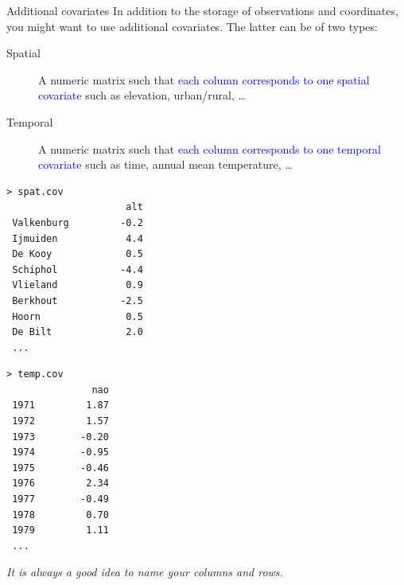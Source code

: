 \documentclass[mode=present,style=simple,paper=screen]{powerdot}
\theoremstyle{plain}%
\theoremstyle{definition}
\theoremstyle{remark}
\newcommand{\advice}[1]{\HandPencilLeft{} \emph{#1}}
\begin{document}
\begin{slide}[toc=,method=direct]{Additional covariates}
  In addition to the storage of observations and coordinates, you
  might want to use additional covariates. The latter can be of two
  types:
  \begin{description}
  \item[Spatial] A numeric matrix such that \textcolor{blue}{each
      column corresponds to one spatial covariate} such as elevation,
    urban/rural, \ldots
  \item[Temporal] A numeric matrix such that \textcolor{blue}{each
      column corresponds to one temporal covariate} such as time,
    annual mean temperature, \ldots
  \end{description}
{\tiny
  \begin{minipage}[l]{.49\linewidth}
\begin{verbatim}
> spat.cov
                     alt
 Valkenburg         -0.2
 Ijmuiden            4.4
 De Kooy             0.5
 Schiphol           -4.4
 Vlieland            0.9
 Berkhout           -2.5
 Hoorn               0.5
 De Bilt             2.0
 ...
\end{verbatim}
  \end{minipage}%
  \begin{minipage}[r]{.49\linewidth}
\begin{verbatim}
> temp.cov
               nao
 1971         1.87
 1972         1.57
 1973        -0.20
 1974        -0.95
 1975        -0.46
 1976         2.34
 1977        -0.49
 1978         0.70
 1979         1.11
 ...
\end{verbatim}
  \end{minipage}
}

\advice{It is always a good idea to name your columns and rows.}
\end{slide}
\end{document}
